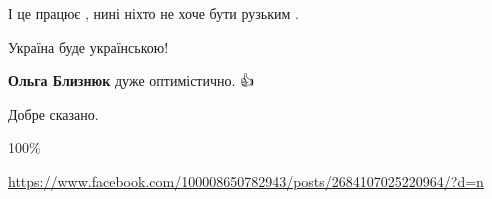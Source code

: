 \begin{itemize}
І це працює , нині ніхто не хоче бути рузьким .


 
Україна буде українською!

\begin{itemize}
 
\textbf{Ольга Близнюк} дуже оптимістично. 👍
\end{itemize}

 
Добре сказано.

 
100\%

 
\url{https://www.facebook.com/100008650782943/posts/2684107025220964/?d=n}

\end{itemize}

